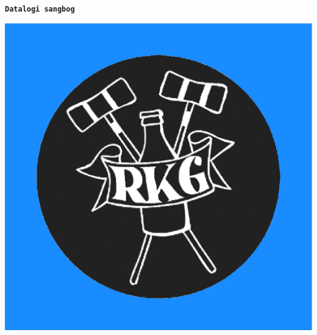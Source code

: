 \pagecolor{myblue}
\pagestyle{empty}

\begin{center}
\textbf{\texttt{\HUGE Datalogi sangbog}}
\end{center}

\vspace{2cm}
\begin{center}
   \includegraphics{forside_rund_done1_godtnok.eps}
\end{center}

\newpage
\pagecolor{white}
